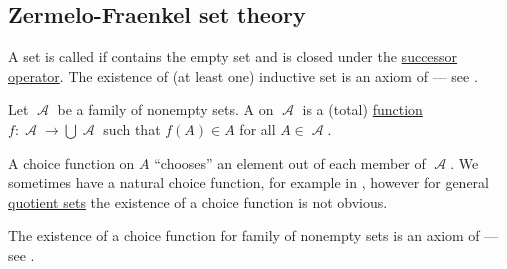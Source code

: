 \subsection{Zermelo-Fraenkel set theory}\label{subsec:zermelo_fraenkel_set_theory}

\begin{definition}\label{def:inductive_set}
  A set is called  if contains the empty set and is closed under the \hyperref[def:basic_set_operations/successor]{successor operator}. The existence of (at least one) inductive set is an axiom of  --- see .
\end{definition}

\begin{definition}\label{def:choice_function}
  Let \( \mscrA \) be a family of nonempty sets. A  on \( \mscrA \) is a (total) \hyperref[def:function]{function} \( f: \mscrA \to \bigcup \mscrA \) such that \( f(A) \in A \) for all \( A \in \mscrA \).

  A choice function on \( A \) \enquote{chooses} an element out of each member of \( \mscrA \). We sometimes have a natural choice function, for example in , however for general \hyperref[def:equivalence_relation/quotient]{quotient sets} the existence of a choice function is not obvious.

  The existence of a choice function for family of nonempty sets is an axiom of  --- see .
\end{definition}

